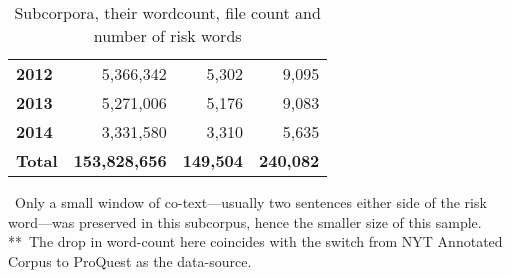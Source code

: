 \begin{table}
\begin{tabular}{p{1.5cm}rrr}
\textbf{2012} & 5,366,342 & 5,302 &  9,095  \\ 
\textbf{2013} & 5,271,006 & 5,176 &  9,083  \\ 
\textbf{2014} & 3,331,580 & 3,310 &  5,635 \\ 
\textbf{Total} & \textbf{153,828,656} & \textbf{149,504} & \textbf{240,082} \\ \bottomrule
\end{tabular}
    \caption{Subcorpora, their wordcount, file count and number of risk words}
    \label{tab:stats}
    \medskip %
\begin{minipage}{0.9\textwidth} %
{\footnotesize *~Only a small window of co-text---usually two sentences either side of the risk word---was preserved in this subcorpus, hence the smaller size of this sample.~\\
 \mbox{*}\mbox{*}~The drop in word-count here coincides with the switch from NYT Annotated Corpus to ProQuest as the data-source.\par}
\end{minipage}
\end{table}


